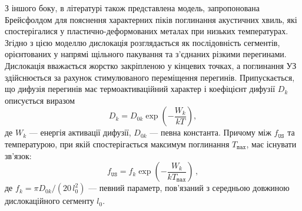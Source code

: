 \documentclass[a4paper,14pt,oneside,openany]{memoir}
\begin{document}
З іншого боку, в літературі \cite{Brailsford} також представлена модель, запропонована Брейсфолдом для пояснення характерних піків поглинання акустичних хвиль, які спостерігалися у пластично-деформованих металах при низьких температурах.
Згідно з цією моделлю дислокація розглядається як послідовність сегментів, орієнтованих у напрямі щільного пакування та з'єднаних різкими перегинами.
Дислокація вважається жорстко закріпленою у кінцевих точках, а поглинання УЗ здійснюється за рахунок стимулюваного переміщення перегинів.
Припускається, що дифузія перегинів має термоактиваційний характер і коефіцієнт дифузії $D_k$ описується виразом
\begin{equation}\label{eqDkink}
  D_k = D_{0k} \exp\left(-\frac{W_k}{kT}\right),
\end{equation}
де $W_k$ --- енергія активації дифузії,
$D_{0k}$ --- певна константа.
Причому між $f_\mathtt{US}$ та температурою, при якій спостерігається максимум поглинання $T_\mathtt{max}$, має існувати зв'язок:
\begin{equation}
\label{eqfk}
f_\mathtt{US}=f_k\exp\left(-\frac{W_k}{kT_\mathtt{max}}\right)\,,
\end{equation}
де
$f_k=\pi D_{0k}/(20 \,l_0^2)$ --- певний параметр, пов'язаний з середньою довжиною дислокаційного сегменту $l_0$.
\end{document}
